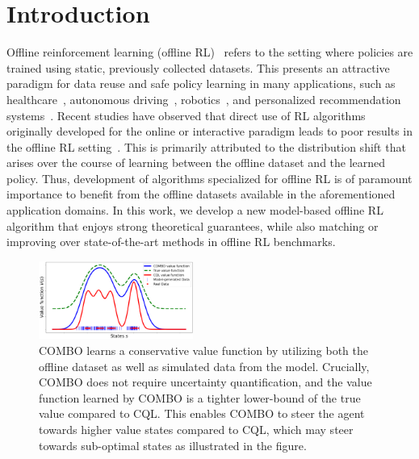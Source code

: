 \section{Introduction}


Offline reinforcement learning (offline RL)~\citep{LangeGR12, levine2020offline} refers to the setting where policies are trained using static, previously collected datasets. This presents an attractive paradigm for data reuse and safe policy learning in many applications, such as healthcare~\cite{Wang2018SupervisedRL}, autonomous driving~\cite{Yu2020BDD100KAD}, robotics~\cite{kalashnikov2018scalable, Rafailov2020LOMPO}, and personalized recommendation systems~\cite{SwaminathanJ15}. Recent studies have observed that direct use of RL algorithms originally developed for the online or interactive paradigm leads to poor results in the offline RL setting~\cite{fujimoto2018off, kumar2019stabilizing, kidambi2020morel}. This is primarily attributed to the distribution shift that arises over the course of learning between the offline dataset and the learned policy. Thus, development of algorithms specialized for offline RL is of paramount importance to benefit from the offline datasets available in the aforementioned application domains. In this work, we develop a new model-based offline RL algorithm that enjoys strong theoretical guarantees, while also matching or improving over state-of-the-art methods in offline RL benchmarks.

\begin{figure}[t!]
    \centering
    \includegraphics[width=0.45\textwidth]{teaser_combo.png}
    \vspace*{-0.5cm}
    \caption{COMBO learns a conservative value function by utilizing both the offline dataset as well as simulated data from the model. Crucially, COMBO does not require uncertainty quantification, and the value function learned by COMBO is a tighter lower-bound of the true value compared to CQL. This enables COMBO to steer the agent towards higher value states compared to CQL, which may steer towards sub-optimal states as illustrated in the figure.}
    \vspace*{-0.6cm}
    \label{fig:teaser}
\end{figure}

